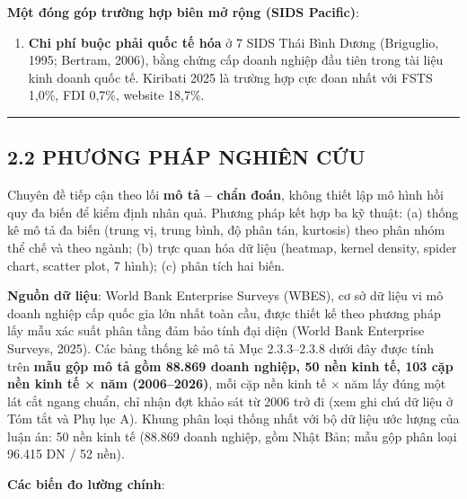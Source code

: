 \documentclass[
  a4paper,
  13pt]{extreport}
\providecommand{\tightlist}{%
  \setlength{\itemsep}{0pt}\setlength{\parskip}{0pt}}
\begin{document}
\textbf{Một đóng góp trường hợp biên mở rộng (SIDS Pacific)}:

\begin{enumerate}
\def\labelenumi{(\arabic{enumi})}
\setcounter{enumi}{4}
\tightlist
\item
  \textbf{Chi phí buộc phải quốc tế hóa} ở 7 SIDS Thái Bình Dương
  (Briguglio, 1995; Bertram, 2006), bằng chứng cấp doanh nghiệp đầu tiên
  trong tài liệu kinh doanh quốc tế. Kiribati 2025 là trường hợp cực
  đoan nhất với FSTS 1,0\%, FDI 0,7\%, website 18,7\%.
\end{enumerate}

\begin{center}\rule{0.5\linewidth}{0.5pt}\end{center}

\hypertarget{phux1b0ux1a1ng-phuxe1p-nghiuxean-cux1ee9u}{%
\subsection{2.2 PHƯƠNG PHÁP NGHIÊN
CỨU}\label{phux1b0ux1a1ng-phuxe1p-nghiuxean-cux1ee9u}}

Chuyên đề tiếp cận theo lối \textbf{mô tả -- chẩn đoán}, không thiết lập
mô hình hồi quy đa biến để kiểm định nhân quả. Phương pháp kết hợp ba kỹ
thuật: (a) thống kê mô tả đa biến (trung vị, trung bình, độ phân tán,
kurtosis) theo phân nhóm thể chế và theo ngành; (b) trực quan hóa dữ
liệu (heatmap, kernel density, spider chart, scatter plot, 7 hình); (c)
phân tích hai biến.

\textbf{Nguồn dữ liệu}: World Bank Enterprise Surveys (WBES), cơ sở dữ
liệu vi mô doanh nghiệp cấp quốc gia lớn nhất toàn cầu, được thiết kế
theo phương pháp lấy mẫu xác suất phân tầng đảm bảo tính đại diện (World
Bank Enterprise Surveys, 2025). Các bảng thống kê mô tả Mục 2.3.3--2.3.8
dưới đây được tính trên \textbf{mẫu gộp mô tả gồm 88.869 doanh nghiệp,
50 nền kinh tế, 103 cặp nền kinh tế × năm (2006--2026)}, mỗi cặp nền
kinh tế × năm lấy đúng một lát cắt ngang chuẩn, chỉ nhận đợt khảo sát từ
2006 trở đi (xem ghi chú dữ liệu ở Tóm tắt và Phụ lục A). Khung phân
loại thống nhất với bộ dữ liệu ước lượng của luận án: 50 nền kinh tế
(88.869 doanh nghiệp, gồm Nhật Bản; mẫu gộp phân loại 96.415 DN / 52
nền).

\textbf{Các biến đo lường chính}:
\end{document}
